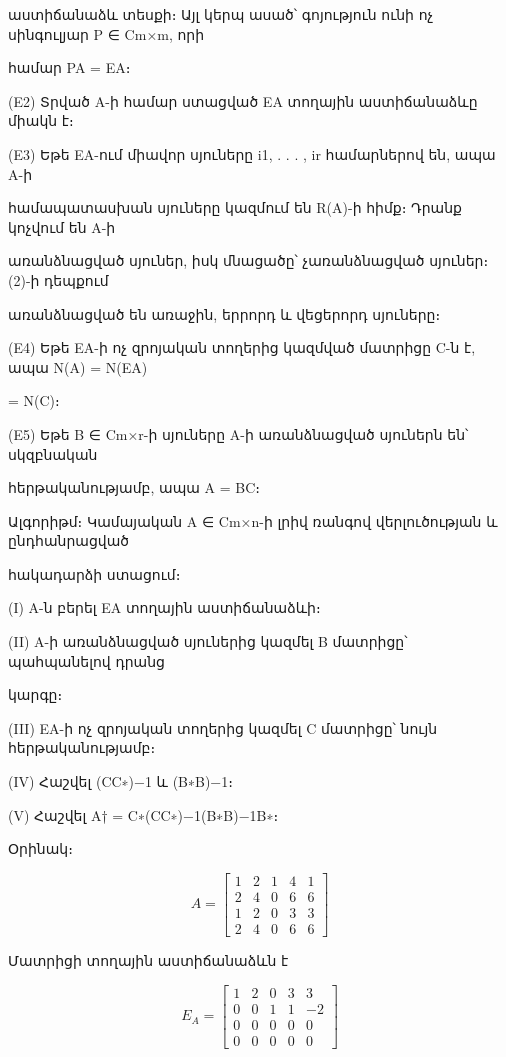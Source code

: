\documentclass[11pt,a4paper]{article}
\begin{document}
աստիճանաձև տեսքի։ Այլ կերպ ասած՝ գոյություն ունի ոչ սինգուլյար P ∈ Cm×m, որի




համար PA = EA։

(E2) Տրված A-ի համար ստացված EA տողային աստիճանաձևը միակն է։

(E3) Եթե EA-ում միավոր սյուները i1, . . . , ir համարներով են, ապա A-ի

համապատասխան սյուները կազմում են R(A)-ի հիմք։ Դրանք կոչվում են A-ի

առանձնացված սյուներ, իսկ մնացածը՝ չառանձնացված սյուներ։ (2)-ի դեպքում

առանձնացված են առաջին, երրորդ և վեցերորդ սյուները։

(E4) Եթե EA-ի ոչ զրոյական տողերից կազմված մատրիցը C-ն է, ապա N(A) = N(EA)

= N(C)։

(E5) Եթե B ∈ Cm×r-ի սյուները A-ի առանձնացված սյուներն են՝ սկզբնական




հերթականությամբ, ապա A = BC։




Ալգորիթմ։ Կամայական A ∈ Cm×n-ի լրիվ ռանգով վերլուծության և ընդհանրացված




հակադարձի ստացում։

(I) A-ն բերել EA տողային աստիճանաձևի։

(II) A-ի առանձնացված սյուներից կազմել B մատրիցը՝ պահպանելով դրանց

կարգը։

(III) EA-ի ոչ զրոյական տողերից կազմել C մատրիցը՝ նույն հերթականությամբ։

(IV) Հաշվել (CC∗)−1 և (B∗B)−1։

(V) Հաշվել A† = C∗(CC∗)−1(B∗B)−1B∗։




Օրինակ։



\[A=\begin{bmatrix}1&2&1&4&1\\2&4&0&6&6\\1&2&0&3&3\\2&4&0&6&6\end{bmatrix}\]


Մատրիցի տողային աստիճանաձևն է



\[E_A=\begin{bmatrix}1&2&0&3&3\\0&0&1&1&-2\\0&0&0&0&0\\0&0&0&0&0\end{bmatrix}\]
\end{document}
